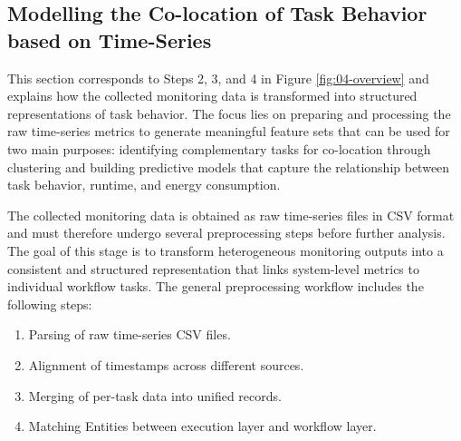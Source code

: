 \subsection{Modelling the Co-location of Task Behavior based on Time-Series}
\label{sec:data_analysis}

This section corresponds to Steps 2, 3, and 4 in Figure \ref{fig:04-overview} and explains how the collected monitoring data is transformed into structured representations of task behavior. The focus lies on preparing and processing the raw time-series metrics to generate meaningful feature sets that can be used for two main purposes: identifying complementary tasks for co-location through clustering and building predictive models that capture the relationship between task behavior, runtime, and energy consumption.

\label{sec:data_preprocessing_general}

The collected monitoring data is obtained as raw time-series files in CSV format and must therefore undergo several preprocessing steps before further analysis. The goal of this stage is to transform heterogeneous monitoring outputs into a consistent and structured representation that links system-level metrics to individual workflow tasks. The general preprocessing workflow includes the following steps:

\begin{enumerate}
    \item Parsing of raw time-series CSV files.
    \item Alignment of timestamps across different sources.
    \item Merging of per-task data into unified records.
    \item Matching Entities between execution layer and workflow layer.
\end{enumerate}

